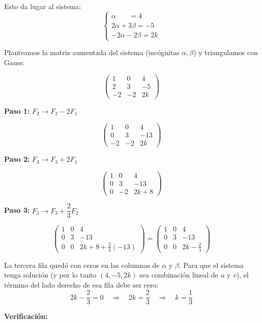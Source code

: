 \documentclass[12pt]{article}
\begin{document}
Esto da lugar al sistema:
\[
\begin{cases}
\alpha \phantom{+3\beta} = 4 \\
2\alpha+3\beta = -5 \\
-2\alpha-2\beta = 2k
\end{cases}
\]

Planteamos la matriz aumentada del sistema (incógnitas $\alpha,\beta$) y triangulamos con Gauss:

\[
\left(\begin{array}{cc|c}
1 & 0 & 4 \\
2 & 3 & -5 \\
-2 & -2 & 2k
\end{array}\right)
\]

\textbf{Paso 1:} $F_2 \to F_2 - 2F_1$

\[
\left(\begin{array}{cc|c}
1 & 0 & 4 \\
0 & 3 & -13 \\
-2 & -2 & 2k
\end{array}\right)
\]

\textbf{Paso 2:} $F_3 \to F_3 + 2F_1$

\[
\left(\begin{array}{cc|c}
1 & 0 & 4 \\
0 & 3 & -13 \\
0 & -2 & 2k+8
\end{array}\right)
\]

\textbf{Paso 3:} $F_3 \to F_3 + \dfrac{2}{3}F_2$

\[
\left(\begin{array}{cc|c}
1 & 0 & 4 \\
0 & 3 & -13 \\
0 & 0 & 2k+8+\frac{2}{3}(-13)
\end{array}\right)
=
\left(\begin{array}{cc|c}
1 & 0 & 4 \\
0 & 3 & -13 \\
0 & 0 & 2k-\frac{2}{3}
\end{array}\right)
\]

La tercera fila quedó con ceros en las columnas de $\alpha$ y $\beta$. Para que el sistema tenga solución (y por lo tanto $(4,-5,2k)$ sea combinación lineal de $u$ y $v$), el término del lado derecho de esa fila debe ser cero:
\[
2k-\frac{2}{3} = 0 \quad \Longrightarrow \quad 2k=\frac{2}{3} \quad \Longrightarrow \quad k=\frac{1}{3}
\]

\textbf{Verificación:}
\end{document}
